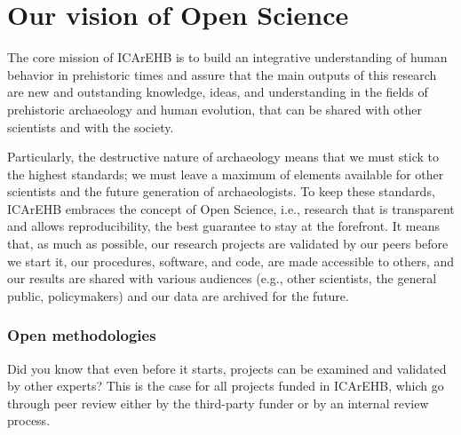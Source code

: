 \documentclass[
  letterpaper,
  DIV=11,
  numbers=noendperiod]{scrreprt}
\author{}
\date{2023-06-05}
\renewcommand*\contentsname{Table of contents}
\newcommand\contentsname{Table of contents}
\begin{document}
\ifdefined\Shaded\renewenvironment{Shaded}{\begin{tcolorbox}[enhanced, sharp corners, borderline west={3pt}{0pt}{shadecolor}, boxrule=0pt, frame hidden, interior hidden, breakable]}{\end{tcolorbox}}\fi

\renewcommand*\contentsname{Table of contents}
{
\hypersetup{linkcolor=}
\setcounter{tocdepth}{2}
\tableofcontents
}

\hypertarget{our-vision-of-open-science}{%
\chapter*{Our vision of Open Science}\label{our-vision-of-open-science}}


The core mission of ICArEHB is to build an integrative understanding of
human behavior in prehistoric times and assure that the main outputs of
this research are new and outstanding knowledge, ideas, and
understanding in the fields of prehistoric archaeology and human
evolution, that can be shared with other scientists and with the
society.

Particularly, the destructive nature of archaeology means that we must
stick to the highest standards; we must leave a maximum of elements
available for other scientists and the future generation of
archaeologists. To keep these standards, ICArEHB embraces the concept of
Open Science, i.e., research that is transparent and allows
reproducibility, the best guarantee to stay at the forefront. It means
that, as much as possible, our research projects are validated by our
peers before we start it, our procedures, software, and code, are made
accessible to others, and our results are shared with various audiences
(e.g., other scientists, the general public, policymakers) and our data
are archived for the future.

\hypertarget{open-methodologies}{%
\subsection*{Open methodologies}\label{open-methodologies}}

Did you know that even before it starts, projects can be examined and
validated by other experts? This is the case for all projects funded in
ICArEHB, which go through peer review either by the third-party funder
or by an internal review process.
\end{document}
